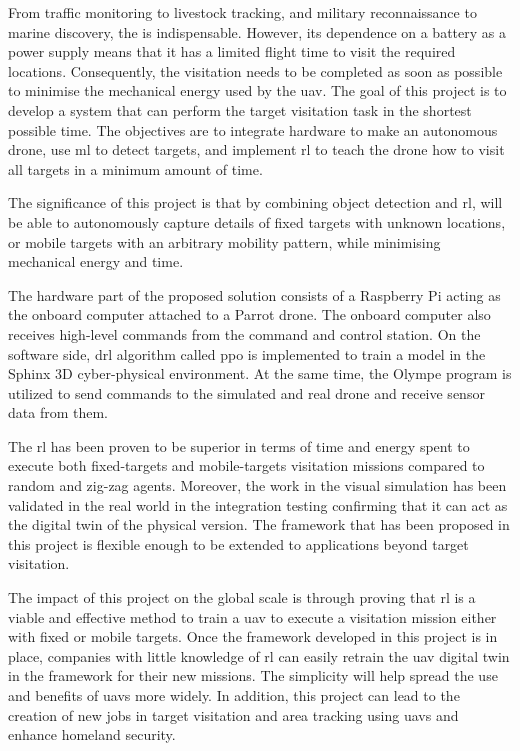 \documentclass[../main.tex]{subfiles}
\begin{document}
From traffic monitoring to livestock tracking, and 
military reconnaissance to marine discovery, the \uav
is indispensable.
However, its dependence on a battery as a power supply means
that it has a limited flight time to visit the required
locations. 
Consequently, the visitation needs to be
completed as soon as possible to minimise 
the mechanical energy used by the \gls{uav}.
The goal of this project is to develop a system 
that can perform the target visitation task in the shortest
possible time. The objectives are to integrate hardware to make
an autonomous drone, use \gls{ml} 
to detect targets,
and implement \gls{rl} to 
teach the drone how to visit all targets in a minimum amount of time.

The significance of this project is that 
by combining object detection and \gls{rl}, \uavs will be
able to autonomously capture details of 
fixed targets with unknown locations, 
or mobile targets with an arbitrary mobility pattern,
while minimising mechanical energy and time.

The hardware part of the proposed solution 
consists of a Raspberry Pi acting as the onboard computer
attached to a Parrot \anafi drone. The onboard computer
also receives high-level commands from the command and control
station. On the software side, \gls{drl} algorithm called \gls{ppo} is 
implemented to train a model in the Sphinx 3D
cyber-physical environment. At the same time,
the Olympe program is utilized
to send commands to the simulated and real \anafi drone
and receive sensor data from them. 

The \gls{rl} has been proven to be superior in terms of time and
energy spent to execute both fixed-targets and mobile-targets
visitation missions compared to random and zig-zag agents.
Moreover, the work in the visual simulation has been validated in the
real world in the integration testing confirming that it can act as
the digital twin of the physical version.
The framework that has been proposed in this project is flexible
enough to be extended to applications beyond target visitation.

The impact of this project on the global scale is through proving that
\gls{rl} is a viable and effective method to train a \gls{uav} to
execute a visitation mission either with fixed or mobile targets.
Once the framework developed in this project is in place, companies
with little knowledge of \gls{rl} can easily retrain the \gls{uav}
digital twin in the framework for their new missions. 
The simplicity will help spread the use and benefits of \glspl{uav}
more widely. 
In addition, this project can lead to the creation of new jobs in
target visitation and area tracking using \glspl{uav} and enhance
homeland security.
\end{document}
